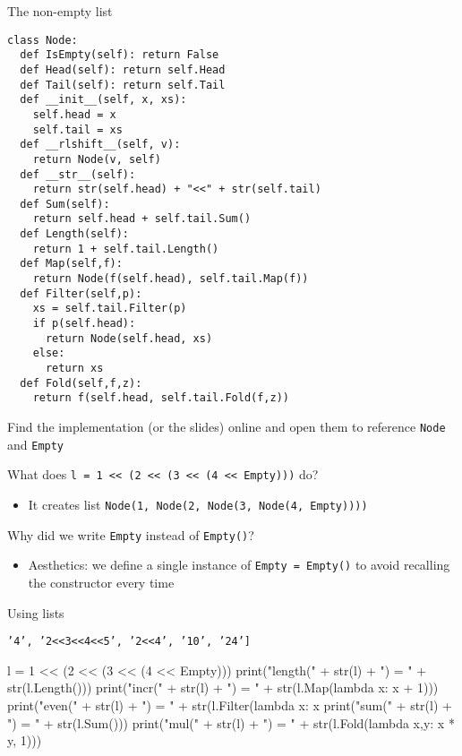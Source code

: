 \documentclass{beamer}
\begin{document}
\begin{frame}[fragile]{The non-empty list}
\begin{lstlisting}
class Node:
  def IsEmpty(self): return False
  def Head(self): return self.Head
  def Tail(self): return self.Tail
  def __init__(self, x, xs):
    self.head = x
    self.tail = xs
  def __rlshift__(self, v):
    return Node(v, self)
  def __str__(self):
    return str(self.head) + "<<" + str(self.tail)
  def Sum(self):
    return self.head + self.tail.Sum()
  def Length(self):
    return 1 + self.tail.Length()
  def Map(self,f):
    return Node(f(self.head), self.tail.Map(f))
  def Filter(self,p):
    xs = self.tail.Filter(p)
    if p(self.head):
      return Node(self.head, xs)
    else:
      return xs
  def Fold(self,f,z):
    return f(self.head, self.tail.Fold(f,z))
\end{lstlisting}
\end{frame}

\begin{slide}{
\item Find the implementation (or the slides) online and open them to reference \texttt{Node} and \texttt{Empty}
\item What does \texttt{l = 1 << (2 << (3 << (4 << Empty)))} do?
\begin{itemize}
\pause 
\item It creates list \texttt{Node(1, Node(2, Node(3, Node(4, Empty))))}
\end{itemize}
\item Why did we write \texttt{Empty} instead of \texttt{Empty()}?
\begin{itemize}
\pause 
\item Aesthetics: we define a single instance of \texttt{Empty = Empty()} to avoid recalling the constructor every time
\end{itemize}
}\end{slide}

\begin{frame}[fragile]{Using lists}
\begin{codewithblock}{\pause \item \texttt{'4', '2<<3<<4<<5', '2<<4', '10', '24']}}
l = 1 << (2 << (3 << (4 << Empty)))
print("length(" + str(l) + ") = " + str(l.Length()))
print("incr(" + str(l) + ") = " + str(l.Map(lambda x: x + 1)))
print("even(" + str(l) + ") = " + str(l.Filter(lambda x: x %
print("sum(" + str(l) + ") = " + str(l.Sum()))
print("mul(" + str(l) + ") = " + str(l.Fold(lambda x,y: x * y, 1)))
\end{codewithblock}
\end{frame}
\end{document}
